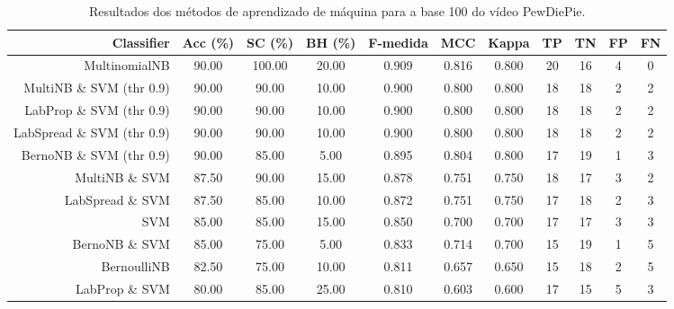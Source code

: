 \begin{table}[!htb]
\centering
\caption{Resultados dos métodos de aprendizado de máquina para a base 100 do vídeo PewDiePie.}
\label{tab:PewDiePie-100}
\begin{tabular}{r|c|c|c|c|c|c|c|c|c|c}
\hline\hline
Classifier & Acc (\%) & SC (\%) & BH (\%) & F-medida & MCC & Kappa & TP & TN & FP & FN \\ \hline
MultinomialNB & 90.00 & 100.00 & 20.00 & 0.909 & 0.816 & 0.800 & 20 & 16 & 4 & 0 \\ 
MultiNB \& SVM (thr 0.9) & 90.00 & 90.00 & 10.00 & 0.900 & 0.800 & 0.800 & 18 & 18 & 2 & 2 \\ 
LabProp \& SVM (thr 0.9) & 90.00 & 90.00 & 10.00 & 0.900 & 0.800 & 0.800 & 18 & 18 & 2 & 2 \\ 
LabSpread \& SVM (thr 0.9) & 90.00 & 90.00 & 10.00 & 0.900 & 0.800 & 0.800 & 18 & 18 & 2 & 2 \\ 
BernoNB \& SVM (thr 0.9) & 90.00 & 85.00 & 5.00 & 0.895 & 0.804 & 0.800 & 17 & 19 & 1 & 3 \\ 
MultiNB \& SVM & 87.50 & 90.00 & 15.00 & 0.878 & 0.751 & 0.750 & 18 & 17 & 3 & 2 \\ 
LabSpread \& SVM & 87.50 & 85.00 & 10.00 & 0.872 & 0.751 & 0.750 & 17 & 18 & 2 & 3 \\ 
SVM & 85.00 & 85.00 & 15.00 & 0.850 & 0.700 & 0.700 & 17 & 17 & 3 & 3 \\ 
BernoNB \& SVM & 85.00 & 75.00 & 5.00 & 0.833 & 0.714 & 0.700 & 15 & 19 & 1 & 5 \\ 
BernoulliNB & 82.50 & 75.00 & 10.00 & 0.811 & 0.657 & 0.650 & 15 & 18 & 2 & 5 \\ 
LabProp \& SVM & 80.00 & 85.00 & 25.00 & 0.810 & 0.603 & 0.600 & 17 & 15 & 5 & 3 \\ 
\hline\hline
\end{tabular}
\end{table}
